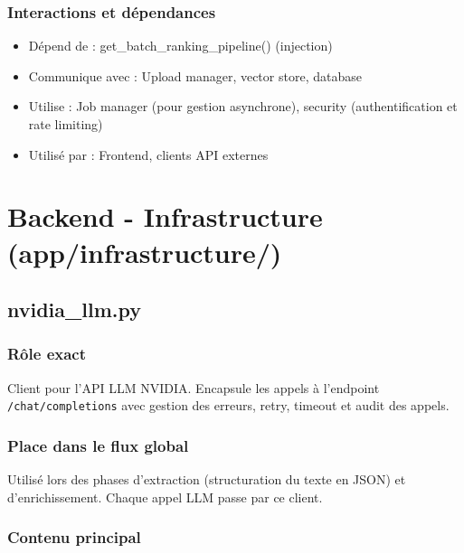 \documentclass[12pt,a4paper,oneside]{book}
\begin{document}
\subsubsection{Interactions et dépendances}

\begin{itemize}
    \item Dépend de : get\_batch\_ranking\_pipeline() (injection)
    \item Communique avec : Upload manager, vector store, database
    \item Utilise : Job manager (pour gestion asynchrone), security (authentification et rate limiting)
    \item Utilisé par : Frontend, clients API externes
\end{itemize}

\newpage


\section{Backend - Infrastructure (app/infrastructure/)}

\subsection{nvidia\_llm.py}

\subsubsection{Rôle exact}

Client pour l'API LLM NVIDIA. Encapsule les appels à l'endpoint \texttt{/chat/completions} avec gestion des erreurs, retry, timeout et audit des appels.

\subsubsection{Place dans le flux global}

Utilisé lors des phases d'extraction (structuration du texte en JSON) et d'enrichissement. Chaque appel LLM passe par ce client.

\subsubsection{Contenu principal}
\end{document}

